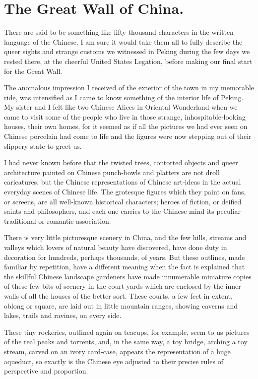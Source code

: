 \documentclass[12pt]{book}
\begin{document}
\chapter{The Great Wall of China.}

There are said to be something like fifty thousand characters in the written
language of the Chinese. I am sure it would take them all to fully describe the
queer sights and strange customs we witnessed in Peking during the few days we
rested there, at the cheerful United States Legation, before making our final start
for the Great Wall.

The anomalous impression I received of the exterior of the town in my memorable ride, was intensified as I came to know something of the interior life of
Peking. My sister and I felt like two Chinese Alices in Oriental Wonderland when
we came to visit some of the people who live in those strange, inhospitable‐looking houses, their own homes, for it seemed as if all the pictures we had ever seen
on Chinese porcelain had come to life and the figures were now stepping out of
their slippery state to greet us.

I had never known before that the twisted trees, contorted objects and queer
architecture painted on Chinese punch‐bowls and platters are not droll caricatures,
but the Chinese representations of Chinese art‐ideas in the actual everyday scenes
of Chinese life. The grotesque figures which they paint on fans, or screens,
are all well‐known historical characters; heroes of fiction, or deified saints and
philosophers, and each one carries to the Chinese mind its peculiar traditional or
romantic association.

There is very little picturesque scenery in China, and the few hills, streams
and valleys which lovers of natural beauty have discovered, have done duty in
decoration for hundreds, perhaps thousands, of years. But these outlines, made
familiar by repetition, have a different meaning when the fact is explained that
the skillful Chinese landscape gardeners have made innumerable miniature copies
of these few bits of scenery in the court yards which are enclosed by the inner
walls of all the houses of the better sort. These courts, a few feet in extent, oblong
or square, are laid out in little mountain ranges, showing caverns and lakes, trails
and ravines, on every side.

These tiny rockeries, outlined again on teacups, for example, seem to us
pictures of the real peaks and torrents, and, in the same way, a toy bridge, arching
a toy stream, carved on an ivory card‐case, appears the representation of a huge
aqueduct, so exactly is the Chinese eye adjusted to their precise rules of perspective
and proportion.
\end{document}

